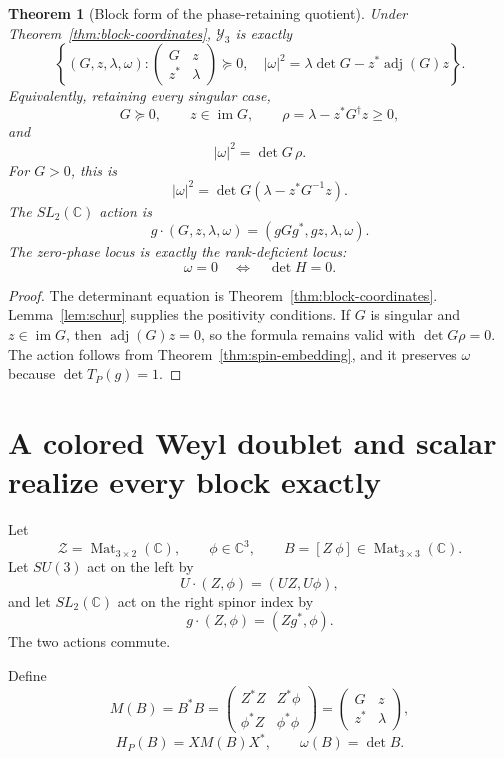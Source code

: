 \documentclass[11pt]{article}
\newtheorem{theorem}{Theorem}[section]
\theoremstyle{definition}
\newcommand{\C}{\mathbb C}
\newcommand{\Mat}{\operatorname{Mat}}
\newcommand{\im}{\operatorname{im}}
\newcommand{\adj}{\operatorname{adj}}
\newcommand{\Y}{\mathcal Y_3}
\newcommand{\cZ}{\mathscr Z}
\begin{document}
\begin{theorem}[Block form of the phase-retaining quotient]\label{thm:Yblock}
Under Theorem~\ref{thm:block-coordinates}, $\Y$ is exactly
\[
 \boxed{
 \left\{(G,z,\lambda,\omega):
 \begin{pmatrix}G&z\\z^*&\lambda\end{pmatrix}\succeq0,
 \quad
 |\omega|^2=\lambda\det G-z^*\adj(G)z
 \right\}.}
\]
Equivalently, retaining every singular case,
\[
 G\succeq0,\qquad z\in\im G,
 \qquad \rho=\lambda-z^*G^\dagger z\geq0,
\]
and
\[
 |\omega|^2=\det G\,\rho.
\]
For $G>0$, this is
\[
 |\omega|^2=\det G\left(\lambda-z^*G^{-1}z\right).
\]
The $SL_2(\C)$ action is
\[
 \boxed{
 g\cdot(G,z,\lambda,\omega)
 =(gGg^*,gz,\lambda,\omega).}
\]
The zero-phase locus is exactly the rank-deficient locus:
\[
 \omega=0
 \quad\Longleftrightarrow\quad
 \det H=0.
\]
\end{theorem}

\begin{proof}
The determinant equation is Theorem~\ref{thm:block-coordinates}.  Lemma~\ref{lem:schur} supplies the positivity conditions.  If $G$ is singular and $z\in\im G$, then $\adj(G)z=0$, so the formula remains valid with $\det G\rho=0$.  The action follows from Theorem~\ref{thm:spin-embedding}, and it preserves $\omega$ because $\det T_P(g)=1$.
\end{proof}

\section{A colored Weyl doublet and scalar realize every block exactly}

Let
\[
 \cZ=\Mat_{3\times2}(\C),
 \qquad
 \phi\in\C^3,
 \qquad
 B=[Z\ \phi]\in\Mat_{3\times3}(\C).
\]
Let $SU(3)$ act on the left by
\[
 U\cdot(Z,\phi)=(UZ,U\phi),
\]
and let $SL_2(\C)$ act on the right spinor index by
\[
 g\cdot(Z,\phi)=(Zg^*,\phi).
\]
The two actions commute.

Define
\[
 M(B)=B^*B
 =\begin{pmatrix}
 Z^*Z&Z^*\phi\\
 \phi^*Z&\phi^*\phi
 \end{pmatrix}
 =\begin{pmatrix}G&z\\z^*&\lambda\end{pmatrix},
\]
\[
 H_P(B)=XM(B)X^*,
 \qquad
 \omega(B)=\det B.
\]
\end{document}
